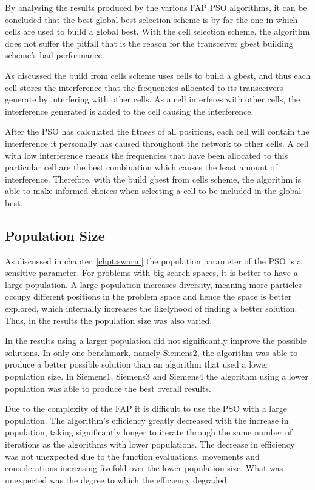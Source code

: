 By analysing the results produced by the various FAP PSO algorithms, it can be concluded that the best global best selection scheme is by far the one in which cells are used to build a global best. With the cell selection scheme, the algorithm does not suffer the pitfall that is the reason for the transceiver gbest building scheme's bad performance.

As discussed the build from cells scheme uses cells to build a gbest, and thus each cell stores the interference that the frequencies allocated to its transceivers generate by interfering with other cells. As a cell interferes with other cells, the interference generated is added to the cell causing the interference.

After the PSO has calculated the fitness of all positions, each cell will contain the interference it personally has caused throughout the network to other cells. A cell with low interference means the frequencies that have been allocated to this particular cell are the best combination which causes the least amount of interference. Therefore, with the build gbest from cells scheme, the algorithm is able to make informed choices when selecting a cell to be included in the global best. 
\subsection{Population Size}
As discussed in chapter~\ref{chpt:swarm} the population parameter of the PSO is a sensitive parameter. For problems with big search spaces, it is better to have a large population. A large population increases diversity, meaning more particles occupy different positions in the problem space and hence the space is better explored, which internally increases the likelyhood of finding a better solution. Thus, in the results the population size was also varied.

In the results using a larger population did not significantly improve the possible solutions. In only one benchmark, namely Siemens2, the algorithm was able to produce a better possible solution than an algorithm that used a lower population size. In Siemens1, Siemens3 and Siemens4 the algorithm using a lower population was able to produce the best overall results.

Due to the complexity of the FAP it is difficult to use the PSO with a large population. The algorithm's efficiency greatly decreased with the increase in population, taking significantly longer to iterate through the same number of iterations as the algorithms with lower populations. The decrease in efficiency was not unexpected due to the function evaluations, movements and considerations increasing fivefold over the lower population size. What was unexpected was the degree to which the efficiency degraded.
